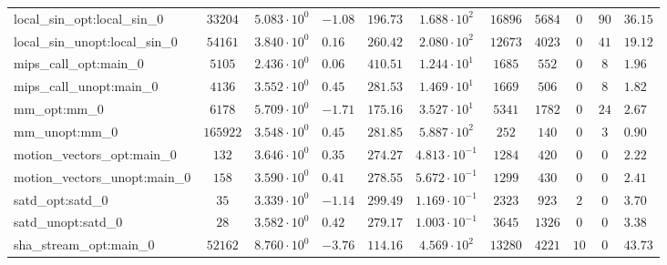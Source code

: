 \begin{tabular}{|l|c|HHc|c|c|c|c|cH|}
local\_sin\_opt:local\_sin\_0                   & $ 33204    $ & $ 5.083 \cdot 10^{0} $ & $ -1.08 $ & $ 196.73 $ & $ 1.688 \cdot 10^{2}  $ & $ 16896  $ & $ 5684  $ & $ 0   $ & $ 90  $ & $ 36.15   $ \\
local\_sin\_unopt:local\_sin\_0                 & $ 54161    $ & $ 3.840 \cdot 10^{0} $ & $ 0.16  $ & $ 260.42 $ & $ 2.080 \cdot 10^{2}  $ & $ 12673  $ & $ 4023  $ & $ 0   $ & $ 41  $ & $ 19.12   $ \\
mips\_call\_opt:main\_0                         & $ 5105     $ & $ 2.436 \cdot 10^{0} $ & $ 0.06  $ & $ 410.51 $ & $ 1.244 \cdot 10^{1}  $ & $ 1685   $ & $ 552   $ & $ 0   $ & $ 8   $ & $ 1.96    $ \\
mips\_call\_unopt:main\_0                       & $ 4136     $ & $ 3.552 \cdot 10^{0} $ & $ 0.45  $ & $ 281.53 $ & $ 1.469 \cdot 10^{1}  $ & $ 1669   $ & $ 506   $ & $ 0   $ & $ 8   $ & $ 1.82    $ \\
mm\_opt:mm\_0                                   & $ 6178     $ & $ 5.709 \cdot 10^{0} $ & $ -1.71 $ & $ 175.16 $ & $ 3.527 \cdot 10^{1}  $ & $ 5341   $ & $ 1782  $ & $ 0   $ & $ 24  $ & $ 2.67    $ \\
mm\_unopt:mm\_0                                 & $ 165922   $ & $ 3.548 \cdot 10^{0} $ & $ 0.45  $ & $ 281.85 $ & $ 5.887 \cdot 10^{2}  $ & $ 252    $ & $ 140   $ & $ 0   $ & $ 3   $ & $ 0.90    $ \\
motion\_vectors\_opt:main\_0                    & $ 132      $ & $ 3.646 \cdot 10^{0} $ & $ 0.35  $ & $ 274.27 $ & $ 4.813 \cdot 10^{-1} $ & $ 1284   $ & $ 420   $ & $ 0   $ & $ 0   $ & $ 2.22    $ \\
motion\_vectors\_unopt:main\_0                  & $ 158      $ & $ 3.590 \cdot 10^{0} $ & $ 0.41  $ & $ 278.55 $ & $ 5.672 \cdot 10^{-1} $ & $ 1299   $ & $ 430   $ & $ 0   $ & $ 0   $ & $ 2.41    $ \\
satd\_opt:satd\_0                               & $ 35       $ & $ 3.339 \cdot 10^{0} $ & $ -1.14 $ & $ 299.49 $ & $ 1.169 \cdot 10^{-1} $ & $ 2323   $ & $ 923   $ & $ 2   $ & $ 0   $ & $ 3.70    $ \\
satd\_unopt:satd\_0                             & $ 28       $ & $ 3.582 \cdot 10^{0} $ & $ 0.42  $ & $ 279.17 $ & $ 1.003 \cdot 10^{-1} $ & $ 3645   $ & $ 1326  $ & $ 0   $ & $ 0   $ & $ 3.38    $ \\
sha\_stream\_opt:main\_0                        & $ 52162    $ & $ 8.760 \cdot 10^{0} $ & $ -3.76 $ & $ 114.16 $ & $ 4.569 \cdot 10^{2}  $ & $ 13280  $ & $ 4221  $ & $ 10  $ & $ 0   $ & $ 43.73   $ \\

\end{tabular}
